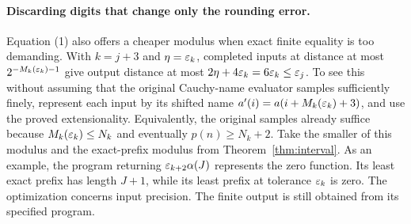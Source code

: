 \paragraph{Discarding digits that change only the rounding error.}
Equation (1) also offers a cheaper modulus when exact finite equality is too demanding. With $k=j+3$ and $\eta=\varepsilon_k$, completed inputs at distance at most $2^{-M_k(\varepsilon_k)-1}$ give output distance at most $2\eta+4\varepsilon_k=6\varepsilon_k\le\varepsilon_j$. To see this without assuming that the original Cauchy-name evaluator samples sufficiently finely, represent each input by its shifted name $a'(i)=a(i+M_k(\varepsilon_k)+3)$, and use the proved extensionality. Equivalently, the original samples already suffice because $M_k(\varepsilon_k)\le N_k$ and eventually $p(n)\ge N_k+2$. Take the smaller of this modulus and the exact-prefix modulus from Theorem~\ref{thm:interval}. As an example, the program returning $\varepsilon_{k+2}\alpha(J)$ represents the zero function. Its least exact prefix has length $J+1$, while its least prefix at tolerance $\varepsilon_k$ is zero. The optimization concerns input precision. The finite output is still obtained from its specified program.
